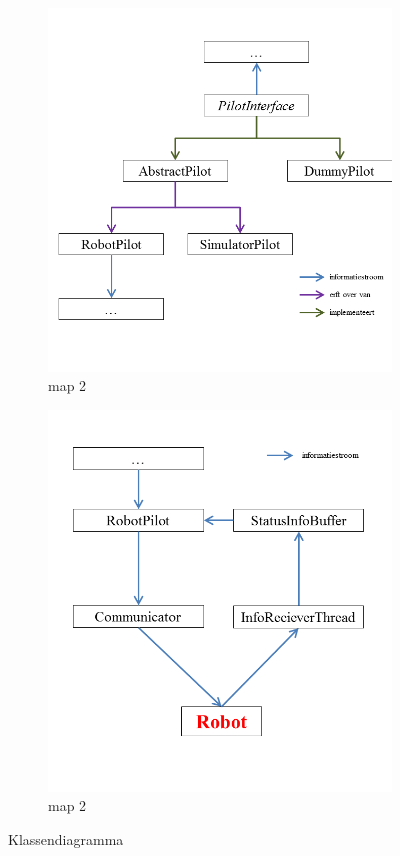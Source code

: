 \documentclass[tt1]{penoverslag}
\begin{document}
\begin{landscape}
\begin{figure}
\begin{subfigure}[hb]{0.52\textwidth}
		\includegraphics[width=\textwidth]{KlasPilot}
	\caption{map 2}
\end{subfigure}%
\begin{subfigure}[hb]{0.52\textwidth}
		\centering
		\includegraphics[width=\textwidth]{KlasRobot}
	\caption{map 2}
\end{subfigure}
\caption{Klassendiagramma}
\label{fig:klasDia}
\end{figure}
\end{landscape}
\end{document}
